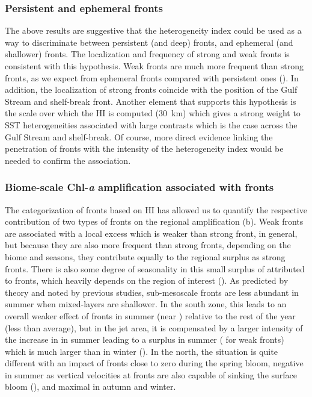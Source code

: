 \subsubsection{Persistent and ephemeral fronts}

The above results are suggestive that the heterogeneity index could be used as a way to discriminate between persistent (and deep) fronts, and ephemeral (and shallower) fronts.
The localization and frequency of strong and weak fronts is consistent with this hypothesis.
Weak fronts are much more frequent than strong fronts, as we expect from ephemeral fronts compared with persistent ones ().
In addition, the localization of strong fronts coincide with the position of the Gulf Stream and shelf-break front.
Another element that supports this hypothesis is the scale over which the HI is computed (\qty{30}{\km}) which gives a strong weight to SST heterogeneities associated with large contrasts which is the case across the Gulf Stream and shelf-break.
Of course, more direct evidence linking the penetration of fronts with the intensity of the heterogeneity index would be needed to confirm the association.

\subsubsection{Biome-scale Chl-\textit{a} amplification associated with fronts}

The categorization of fronts based on HI has allowed us to quantify the respective contribution of two types of fronts on the regional  amplification (b).
Weak fronts are associated with a local  excess which is weaker than strong front, in general, but because they are also more frequent than strong fronts, depending on the biome and seasons, they contribute equally to the regional  surplus as strong fronts.
There is also some degree of seasonality in this small surplus of  attributed to fronts, which heavily depends on the region of interest ().
As predicted by theory and noted by previous studies, sub-mesoscale fronts  are less abundant in summer when mixed-layers are shallower.
In the south zone, this leads to an overall weaker effect of fronts in summer (near ) relative to the rest of the year (less than  average), but in the jet area, it is compensated by a larger intensity of the increase in  in summer leading to a  surplus in summer ( for weak fronts) which is much larger than in winter ().
In the north, the situation is quite different with an impact of fronts close to zero during the spring bloom, negative in summer as vertical velocities at fronts are also capable of sinking the surface bloom (\cite{levy_2018}), and maximal in autumn and winter.

